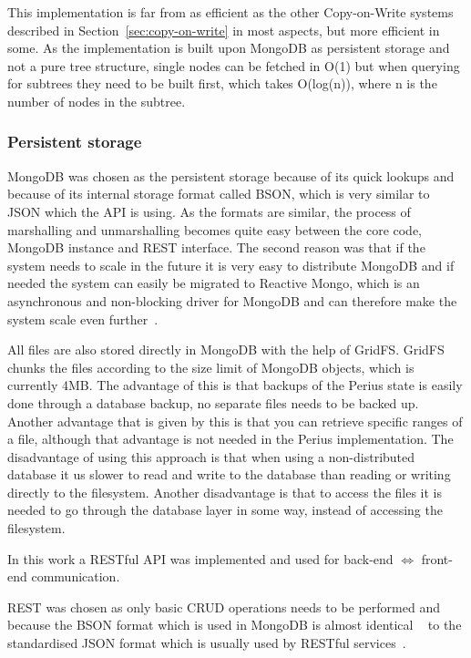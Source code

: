 \documentclass[a4paper,12pt]{article}
\newcounter{subsubsubsection}[subsubsection]
\newcommand{\Iff}{\Leftrightarrow}
\begin{document}
This implementation is far from as efficient as the other Copy-on-Write systems described in
Section~\ref{sec:copy-on-write} in most aspects, but more efficient in some. As the implementation
is built upon MongoDB as persistent storage and not a pure tree structure, single nodes can be
fetched in O(1) but when querying for subtrees they need to be built first, which takes O(log(n)),
where n is the number of nodes in the subtree. 

\subsubsection{Persistent storage}
\label{persistent_storage}
MongoDB was chosen as the persistent storage because of its quick lookups and because of its
internal storage format called BSON, which is very similar to JSON which the API is using. As the
formats are similar, the process of marshalling and unmarshalling becomes quite easy between the
core code, MongoDB instance and REST interface.  The second reason was that if the system needs to
scale in the future it is very easy to distribute MongoDB and if needed the system can easily be
migrated to Reactive Mongo, which is an asynchronous and non-blocking driver for MongoDB and can
therefore make the system scale even further~\cite{REACTIVEMONGO}.

All files are also stored directly in MongoDB with the help of GridFS. GridFS chunks the files 
according to the size limit of MongoDB objects, which is currently 4MB. The advantage of this is 
that backups of the Perius state is easily done through a database backup, no separate files 
needs to be backed up. Another advantage that is given by this is that you can retrieve specific 
ranges of a file, although that advantage is not needed in the Perius implementation. The 
disadvantage of using this approach is that when using a non-distributed database it us slower 
to read and write to the database than reading or writing directly to the filesystem. Another 
disadvantage is that to access the files it is needed to go through the database layer in some 
way, instead of accessing the filesystem.

\label{sec:API}
In this work a RESTful API was implemented and used for back-end $\Iff$ front-end
communication.

REST was chosen as only basic CRUD operations needs to be performed and because the BSON format
which is used in MongoDB is almost identical ~\cite{BSON} to the standardised JSON format which is
usually used by RESTful services~\cite{JSON}. 
\end{document}
